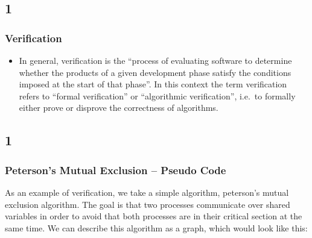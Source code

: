 \documentclass[handout]{beamer}
\begin{document}
\begin{footnotesize}
\subsection*{1}
\begin{frame}
  \frametitle{Verification}
  \begin{itemize}
  \item
  In general, verification is the ``process of evaluating software to determine whether the products of a given development phase satisfy the conditions imposed at the start of that phase''. In this context the term verification refers to ``formal verification'' or ``algorithmic verification'', i.e.\ to formally either prove or disprove the correctness of algorithms.
  \end{itemize}
\end{frame}

\subsection*{1}
\begin{frame}
  \frametitle{Peterson's Mutual Exclusion -- Pseudo Code}
As an example of verification, we take a simple algorithm, peterson's mutual exclusion algorithm. The goal is that two processes communicate over shared variables in order to avoid that both processes are in their critical section at the same time. We can describe this algorithm as a graph, which would look like this:
\end{frame}


\end{footnotesize}
\end{document}
